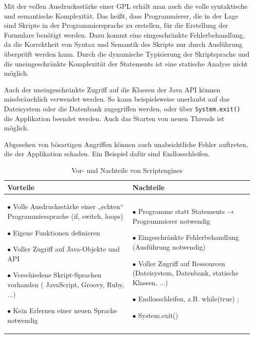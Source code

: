 Mit der vollen Ausdrucksstärke einer GPL erhält man auch die volle syntaktische und semantische Komplexität. Das heißt, dass Programmierer, die in der Lage sind Skripte in der Programmiersprache zu erstellen, für die Erstellung der Formulare benötigt werden. Dazu kommt eine ein\-ge\-schränk\-te Fehlerbehandlung, da die Korrektheit von Syntax und Semantik des Skripts nur durch Ausführung überprüft werden kann. Durch die dynamische Typisierung der Skriptsprache und die unein\-ge\-schränk\-te Komplexität der Statements ist eine statische Analyse nicht möglich.

Auch der unein\-ge\-schränk\-te Zugriff auf die Klassen der Java API können missbräuchlich verwendet werden. So kann beispielsweise unerlaubt auf das Dateisystem oder die Datenbank zugegriffen werden, oder über \texttt{System.exit()} die Applikation beendet werden. Auch das Starten von neuen Threads ist möglich. 

Abgesehen von bösartigen Angriffen können auch unabsichtliche Fehler auf\-tre\-ten, die der Applikation schaden. Ein Beispiel dafür sind Endlosschleifen.


\begin{table}
\begin{tabular}{|p{} | p{} |}
	\hline
	Vorteile & Nachteile \\
	\hline

	$\bullet$ Volle Ausdrucksstärke einer „echten“ Programmiersprache (if, switch, loops)
		
	$\bullet$ Eigene Funktionen definieren		 
		 
	$\bullet$ Voller Zugriff auf Java-Objekte und API
		 
	$\bullet$ Verschiedene Skript-Sprachen vorhanden ( JavaScript, Groovy, Ruby, ...)	

	$\bullet$ Kein Erlernen einer neuen Sprache notwendig

	&
	
	$\bullet$ Programme statt Statements → Programmierer notwendig
	
	$\bullet$ Eingeschränkte Fehlerbehandlung (Ausführung notwendig)
	
	$\bullet$ Voller Zugriff auf Ressourcen (Dateisystem, Datenbank, statische Klassen, ...)
	
	$\bullet$ Endlosschleifen, z.B. while(true) { ; }
	
	$\bullet$ System.exit()

	\\
	\hline

\end{tabular}
\caption{Vor- und Nachteile von Scriptengines}
\label{tbl_vergleich_scriptengines}
\end{table}


